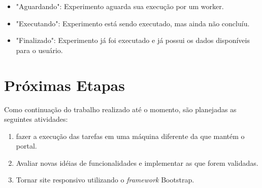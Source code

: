 \documentclass[tg]{mdtufsm}
\begin{document}
\begin{itemize}
	\item "Aguardando": Experimento aguarda sua execução por um worker.
	\item "Executando": Experimento está sendo executado, mas ainda não concluíu.
	\item "Finalizado": Experimento já foi executado e já possui os dados disponíveis para o usuário.
\end{itemize}

\chapter{Próximas Etapas}

Como continuação do trabalho realizado até o momento, são planejadas as seguintes atividades:

\begin{enumerate}
	\item fazer a execução das tarefas em uma máquina diferente da que mantém o portal.
	\item Avaliar novas idéias de funcionalidades e implementar as que forem validadas.
	\item Tornar site responsivo utilizando o \emph{framework} Bootstrap.
\end{enumerate}

\setlength{\baselineskip}{\baselineskip}


\end{document}
